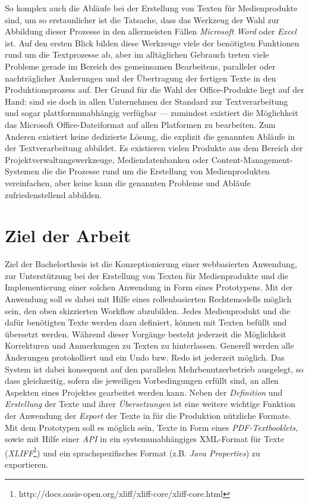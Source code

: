 \documentclass[11pt,a4paper]{article}
\begin{document}
So komplex auch die Abläufe bei der Erstellung von Texten für Medienprodukte sind, um so erstaunlicher ist die Tatsache, dass das Werkzeug der Wahl zur Abbildung dieser Prozesse in den allermeisten Fällen \emph{Microsoft Word} oder \emph{Excel} ist. Auf den ersten Blick bilden diese Werkzeuge viele der benötigten Funktionen rund um die Textprozesse ab, aber im alltäglichen Gebrauch treten viele Probleme gerade im Bereich des gemeinsamen Bearbeitens, paralleler oder nachträglicher Änderungen und der Übertragung der fertigen Texte in den Produktionsprozess auf. Der Grund für die Wahl der Office-Produkte liegt auf der Hand: sind sie doch in allen Unternehmen der Standard zur Textverarbeitung und sogar plattformunabhängig verfügbar --- zumindest existiert die Möglichkeit das Microsoft Office-Dateiformat auf allen Platformen zu bearbeiten. Zum Anderen existiert keine dedizierte Lösung, die explizit die genannten Abläufe in der Textverarbeitung abbildet. Es existieren vielen Produkte aus dem Bereich der Projektverwaltungswerkzeuge, Mediendatenbanken oder Content-Management-Systemen die die Prozesse rund um die Erstellung von Medienprodukten vereinfachen, aber keine kann die genannten Probleme und Abläufe zufriedenstellend abbilden.

\section*{Ziel der Arbeit}

Ziel der Bachelorthesis ist die Konzeptionierung einer webbasierten Anwendung, zur Unterstützung bei der Erstellung von Texten für Medienprodukte und die Implementierung einer solchen Anwendung in Form eines Prototypens. Mit der Anwendung soll es dabei mit Hilfe eines rollenbasierten Rechtemodells möglich sein, den oben skizzierten Workflow abzubilden. Jedes Medienprodukt und die dafür benötigten Texte werden dazu definiert, können mit Texten befüllt und übersetzt werden. Während dieser Vorgänge besteht jederzeit die Möglichkeit Korrekturen und Anmerkungen zu Texten zu hinterlassen. Generell werden alle Änderungen protokolliert und ein Undo bzw. Redo ist jederzeit möglich. Das System ist dabei konsequent auf den parallelen Mehrbenutzerbetrieb ausgelegt, so dass gleichzeitig, sofern die jeweiligen Vorbedingungen erfüllt sind, an allen Aspekten eines Projektes gearbeitet werden kann. Neben der \emph{Definition} und \emph{Erstellung} der Texte und ihrer \emph{Übersetzungen} ist eine weitere wichtige Funktion der Anwendung der \emph{Export} der Texte in für die Produktion nützliche Formate. Mit dem Prototypen soll es möglich sein, Texte in Form eines \emph{PDF-Textbooklets}, sowie mit Hilfe einer \emph{API} in ein systemunabhängiges XML-Format für Texte (\emph{XLIFF}\footnote{http://docs.oasis-open.org/xliff/xliff-core/xliff-core.html}) und ein sprachspezifisches Format (z.B. \emph{Java Properties}) zu exportieren. 
\end{document}
